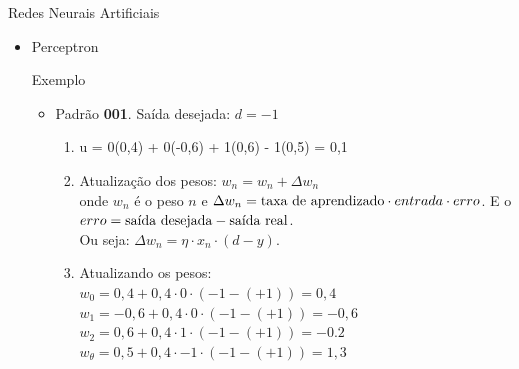 \documentclass{libs/ufc_format}
\begin{document}
\begin{frame}{Redes Neurais Artificiais}
    \begin{itemize}
        \item Perceptron\\
        \begin{exampleblock}{Exemplo}
            \begin{itemize}
                \justifying
                \item Padrão \textbf{001}. Saída desejada: $d = -1$
                    \begin{enumerate}
                        \item<2-> u = \alert<3>{0}(\alert<4>{0,4}) + \alert<3>{0}(\alert<4>{-0,6}) + \alert<3>{1}(\alert<4>{0,6}) \alert<3>{- 1}(\alert<4>{0,5}) = 0,1\\
                        \item<5-> Atualização dos pesos: $w_{n} = w_{n} + \Delta w_{n}$\\
                        onde $w_{n}$ é o peso $n$ e $\Delta w_{n} = \hbox{taxa de aprendizado}\cdot entrada \cdot erro$. E o $erro = \hbox{saída desejada} - \hbox{saída real}$.\\
                        Ou seja: $\Delta w_{n} = \eta\cdot x_{n}\cdot(d - y) $.
                        \item<6-> Atualizando os pesos:\\
                        $w_{0} = 0,4 + 0,4\cdot 0\cdot(-1 - (+1)) = 0,4$\\
                        $w_{1} = -0,6 + 0,4\cdot 0\cdot(-1 - (+1)) = -0,6$\\
                        $w_{2} = 0,6 + 0,4\cdot 1\cdot(-1 - (+1)) = -0.2$\\
                        $w_{\theta} = 0,5 + 0,4\cdot-1\cdot(-1 - (+1)) = 1,3$
                    \end{enumerate}
            \end{itemize}
        \end{exampleblock}
    \end{itemize}
\end{frame}
\end{document}
